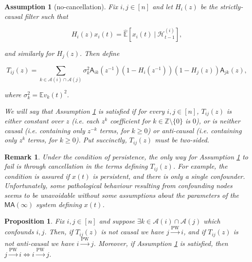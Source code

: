 \documentclass{statsoc}
\def\pwgc{\overset{\text{PW}}{\rightarrow}}  %
\def\MA{\mathsf{MA}}  %
\def\A{\mathsf{A}}  %
\def\H{\mathcal{H}}  %
\newcommand{\linE}[2]{\hat{\E}[#1\ |\ #2]}  %
\newcommand{\anc}[1]{\mathcal{A}(#1)}  %
\newtheorem{proposition}{Proposition}
\newtheorem{remark}{Remark}
\newtheorem{assumption}{Assumption}
\def\H{\mathcal{H}}  %
\def\E{\mathbb{E}}  %
\def\Z{\mathbb{Z}}  %
\begin{document}
\begin{assumption}[no-cancellation]
  \label{ass:T_causality}
  Fix $i, j \in [n]$ and let $H_i(z)$ be the strictly-causal filter
  such that

  \begin{equation*}
    H_i(z)x_i(t) = \linE{x_i(t)}{\H_{t - 1}^{(i)}},
  \end{equation*}

  and similarly for $H_j(z)$.  Then define

  \begin{equation}
    \label{eqn:T_filter}
    T_{ij}(z) = \sum_{k \in \anc{i} \cap \anc{j}}\sigma_k^2\A_{ik}(z^{-1})(1 - H_i(z^{-1}))(1 - H_j(z))\A_{jk}(z),
  \end{equation}

  where $\sigma_k^2 = \E v_k(t)^2$.

  We will say that Assumption \ref{ass:T_causality} is satisfied if
  for every $i, j \in [n]$, $T_{ij}(z)$ is either constant over $z$
  (i.e. each $z^k$ coefficient for $k \in \Z \setminus \{0\}$ is $0$),
  or is \textit{neither} causal (i.e. containing only $z^{-k}$ terms,
  for $k \ge 0$) \textit{or} anti-causal (i.e. containing only $z^k$
  terms, for $k \ge 0$).  Put succinctly, $T_{ij}(z)$ must be
  two-sided.
\end{assumption}

\begin{remark}
  Under the condition of persistence, the only way for Assumption
  \ref{ass:T_causality} to fail is through cancellation in the terms
  defining $T_{ij}(z)$.  For example, the condition is assured if
  $x(t)$ is persistent, and there is only a single confounder.
  Unfortunately, some pathological behaviour resulting from
  confounding nodes seems to be unavoidable without some assumptions
  about the parameters of the $\MA(\infty)$ system defining $x(t)$.
\end{remark}

\begin{proposition}
  \label{prop:persistence_converse}
  Fix $i, j \in [n]$ and suppose $\exists k \in \anc{i} \cap \anc{j}$
  which confounds $i, j$.  Then, if $T_{ij}(z)$ is not causal we have
  $j \pwgc i$, and if $T_{ij}(z)$ is not anti-causal we have
  $i \pwgc j$.  Moreover, if Assumption \ref{ass:T_causality} is
  satisfied, then $j \pwgc i \iff i \pwgc j$.
\end{proposition}
\end{document}

